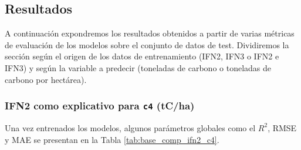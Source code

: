 \subsection{Resultados}\label{anexo:resultados}

A continuación expondremos los resultados obtenidos a partir de varias métricas de evaluación de los modelos sobre el conjunto de datos de test. Dividiremos la sección según el origen de los datos de entrenamiento (IFN2, IFN3 o IFN2 e IFN3) y según la variable a predecir (toneladas de carbono o toneladas de carbono por hectárea).

\subsubsection{IFN2 como explicativo para \texttt{c4} (tC/ha)}


Una vez entrenados los modelos, algunos parámetros globales como el $R^2$, RMSE y MAE se presentan en la Tabla \ref{tab:base_comp_ifn2_c4}.

